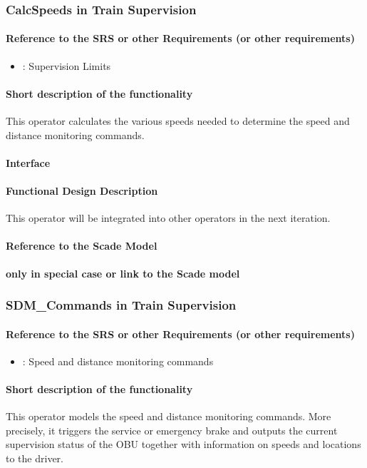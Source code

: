 \subsubsection{CalcSpeeds in Train Supervision}
\paragraph{Reference to the SRS or other Requirements (or other requirements)}
\begin{itemize}
	\item \cite[Chapt.~3.13.9]{subset-026}: Supervision Limits 
\end{itemize}
\paragraph{Short description of the functionality}
This operator calculates the various speeds needed to determine the speed and distance monitoring commands.
\paragraph{Interface}
\paragraph{Functional Design Description}
This operator will be integrated into other operators in the next iteration.
\paragraph{Reference to the Scade Model}
\textbf{only in special case or link to the Scade model}

\subsubsection{SDM\_Commands in Train Supervision}
\paragraph{Reference to the SRS or other Requirements (or other requirements)}
\begin{itemize}
	\item \cite[Chapt.~3.13.10]{subset-026}: Speed and distance monitoring commands 
\end{itemize}
\paragraph{Short description of the functionality}
This operator models the speed and distance monitoring commands. More precisely, it triggers the service or emergency brake and outputs the current supervision status of the OBU together with information on speeds and locations to the driver.

